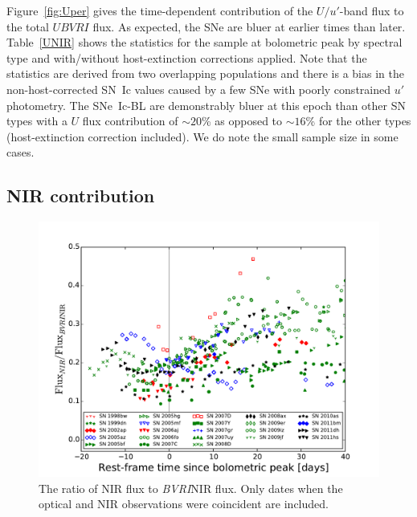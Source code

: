 \documentclass[a4paper,fleqn,usenatbib]{mnras}
\begin{document}
Figure~\ref{fig:Uper} gives the time-dependent contribution of the $U/u'$-band flux to the total $UBVRI$ flux. As expected, the SNe are bluer at earlier times than later. Table~\ref{UNIR} shows the statistics for the sample at bolometric peak by spectral type and with/without host-extinction corrections applied. Note that the statistics are derived from two overlapping populations and there is a bias in the non-host-corrected SN~Ic values caused by a few SNe with poorly constrained $u'$ photometry. The SNe~Ic-BL are demonstrably bluer at this epoch than other SN types with a $U$ flux contribution of $\sim 20$\% as opposed to $\sim 16$\% for the other types (host-extinction correction included). We do note the small sample size in some cases.

\subsection{NIR contribution}
\begin{figure}
\centering
\includegraphics[scale=0.4]{BVRI-NIR-fraction.pdf}
\caption{The ratio of NIR flux to \textit{BVRI}NIR flux. Only dates when the optical and NIR observations were coincident are included.}
\label{fig:BVRINIR}
\end{figure}
\end{document}
